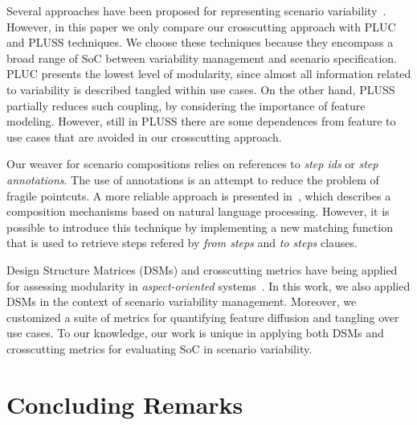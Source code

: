 \documentclass{acm_proc_article-sp}
\begin{document}
Several approaches have been proposed for representing 
scenario variability~\cite{jacobson-reuse-book, favaro-icsr-98, eriksson-splc-2005,bertolino-esec-2003}. However, in this 
paper we only compare our crosscutting approach with PLUC and 
PLUSS techniques. We choose these techniques because they encompass a broad range of SoC between 
variability management and scenario specification. PLUC presents the lowest level of 
modularity, since almost all information related to variability is described tangled within use cases. On the other hand, PLUSS 
partially reduces such coupling, by considering the importance of feature modeling.
 However, still in PLUSS there are some dependences from feature to use cases that are avoided in our crosscutting approach.  

Our weaver for scenario compositions relies on references to \emph{step ids} or \emph{step annotations}. The use of annotations is an attempt to reduce the problem of fragile pointcuts. A more reliable approach is presented in~\cite{rashid-aosd-2007}, which describes a composition mechanisms based on natural language processing. However, it is possible to introduce this technique by implementing a new matching function that is used to retrieve steps refered by \emph{from steps} and \emph{to steps} clauses.

Design Structure Matrices (DSMs) and crosscutting metrics have being applied for assessing modularity in \emph{aspect-oriented} 
systems~\cite{vlopes-aosd-2005, sullivan-fse-2005,garcia-taosd-2005, greenwood-ecoop-2007}. In this work, we also applied DSMs in the context of scenario variability management. Moreover, we customized a suite of metrics for quantifying feature diffusion and tangling over use cases. To our knowledge, our work is unique in applying both DSMs and crosscutting metrics for evaluating SoC in scenario variability.





\section{Concluding Remarks}
\label{concluding-remarks}
\end{document}
